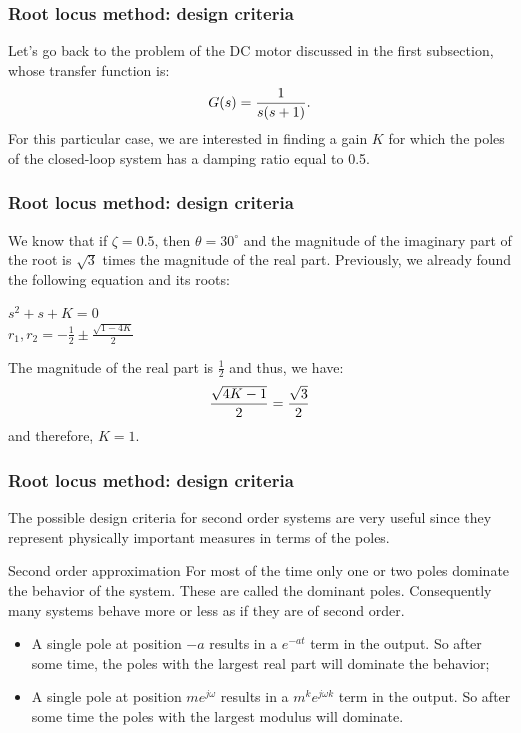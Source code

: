 \begin{frame}
\frametitle{Root locus method: design criteria}
	\begin{example}
	\justify
		Let's go back to the problem of the DC motor discussed in the first subsection, whose transfer function is:
		\vspace{-0.5em}
		\begin{equation}
		G(s) = \frac{1}{s(s+1)}.
		\vspace{-0.5em}
		\end{equation}
		For this particular case, we are interested in finding a gain $K$ for which the poles of the closed-loop system has a damping ratio equal to 0.5.\\
	\end{example}
\end{frame}

\begin{frame}
	\frametitle{Root locus method: design criteria}
	\begin{exampleblock}{}
		\justify
		We know that if $\zeta = 0.5$, then $\theta = 30^{\circ}$ and the magnitude of the imaginary part of the root is $\sqrt{3}$ times the magnitude of the real part. 
		Previously, we already found the following equation and its roots:
		\begin{center}
		$s^2 + s + K = 0$\\
		$r_1,r_2 = -\frac{1}{2} \pm \frac{\sqrt{1 - 4K}}{2}$
		\end{center}
		The magnitude of the real part is $\frac{1}{2}$ and thus, we have:
		\vspace{-0.5em}
		\begin{equation}
		\frac{\sqrt{4K - 1}}{2} = \frac{\sqrt{3}}{2}
		\vspace{-0.5em}
		\end{equation}
		and therefore, $K = 1$.
	\end{exampleblock}
\end{frame}

\begin{frame}
\frametitle{Root locus method: design criteria}
\justify
	The possible design criteria for second order systems are very useful since they represent physically important measures in terms of the poles.\\
	\begin{alertblock}{Second order approximation}
		For most of the time only one or two poles dominate the behavior of the system. These are called the dominant poles. Consequently many systems behave more or less as if they are of second order. 
	\end{alertblock}
	\begin{itemize}
		\item A single pole at position $-a$ results in a $e^{-at}$ term in the output. So after some time, the poles with the largest real part will dominate the behavior;
		\item A single pole at position $me^{j\omega}$ results in a $m^ke^{j\omega k}$ term in the output. So after some time the poles with the largest modulus will dominate. 
	\end{itemize}
\end{frame}
	
